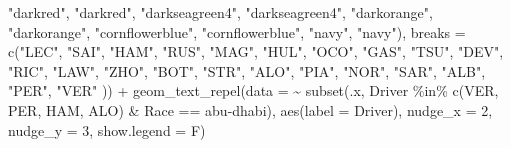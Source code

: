 \documentclass[
]{book}
\newenvironment{Shaded}{\begin{snugshade}}{\end{snugshade}}
\newcommand{\AttributeTok}[1]{\textcolor[rgb]{0.77,0.63,0.00}{#1}}
\newcommand{\DecValTok}[1]{\textcolor[rgb]{0.00,0.00,0.81}{#1}}
\newcommand{\FunctionTok}[1]{\textcolor[rgb]{0.00,0.00,0.00}{#1}}
\newcommand{\NormalTok}[1]{#1}
\newcommand{\SpecialCharTok}[1]{\textcolor[rgb]{0.00,0.00,0.00}{#1}}
\newcommand{\StringTok}[1]{\textcolor[rgb]{0.31,0.60,0.02}{#1}}
\begin{document}
\begin{Shaded}
\begin{Highlighting}[]
                                \StringTok{"darkred"}\NormalTok{, }\StringTok{"darkred"}\NormalTok{, }
                                \StringTok{"darkseagreen4"}\NormalTok{, }\StringTok{"darkseagreen4"}\NormalTok{,}
                                \StringTok{"darkorange"}\NormalTok{, }\StringTok{"darkorange"}\NormalTok{,}
                                \StringTok{"cornflowerblue"}\NormalTok{, }\StringTok{"cornflowerblue"}\NormalTok{,}
                                \StringTok{"navy"}\NormalTok{, }\StringTok{"navy"}\NormalTok{),}
                     \AttributeTok{breaks =} \FunctionTok{c}\NormalTok{(}\StringTok{"LEC"}\NormalTok{, }\StringTok{"SAI"}\NormalTok{,}
                                \StringTok{"HAM"}\NormalTok{, }\StringTok{"RUS"}\NormalTok{, }
                                \StringTok{"MAG"}\NormalTok{, }\StringTok{"HUL"}\NormalTok{, }
                                \StringTok{"OCO"}\NormalTok{, }\StringTok{"GAS"}\NormalTok{,}
                                \StringTok{"TSU"}\NormalTok{,  }\StringTok{"DEV"}\NormalTok{, }\StringTok{"RIC"}\NormalTok{, }\StringTok{"LAW"}\NormalTok{,}
                                \StringTok{"ZHO"}\NormalTok{, }\StringTok{"BOT"}\NormalTok{,}
                                \StringTok{"STR"}\NormalTok{, }\StringTok{"ALO"}\NormalTok{, }
                                \StringTok{"PIA"}\NormalTok{, }\StringTok{"NOR"}\NormalTok{,}
                                \StringTok{"SAR"}\NormalTok{, }\StringTok{"ALB"}\NormalTok{,}
                                \StringTok{"PER"}\NormalTok{, }\StringTok{"VER"}
\NormalTok{                                )) }\SpecialCharTok{+}
  \FunctionTok{geom\_text\_repel}\NormalTok{(}\AttributeTok{data =} \SpecialCharTok{\textasciitilde{}} \FunctionTok{subset}\NormalTok{(.x, Driver }\SpecialCharTok{\%in\%} \FunctionTok{c}\NormalTok{(}\StringTok{\textquotesingle{}VER\textquotesingle{}}\NormalTok{, }\StringTok{\textquotesingle{}PER\textquotesingle{}}\NormalTok{, }\StringTok{\textquotesingle{}HAM\textquotesingle{}}\NormalTok{, }\StringTok{\textquotesingle{}ALO\textquotesingle{}}\NormalTok{) }\SpecialCharTok{\&}\NormalTok{ Race }\SpecialCharTok{==} \StringTok{\textquotesingle{}abu{-}dhabi\textquotesingle{}}\NormalTok{),}
            \FunctionTok{aes}\NormalTok{(}\AttributeTok{label =}\NormalTok{ Driver),}
            \AttributeTok{nudge\_x =} \DecValTok{2}\NormalTok{, }\AttributeTok{nudge\_y =} \DecValTok{3}\NormalTok{, }\AttributeTok{show.legend =}\NormalTok{ F)}
\end{Highlighting}
\end{Shaded}
\end{document}
